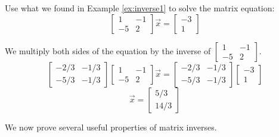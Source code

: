 \documentclass{ximera}
\begin{document}
\begin{example}\label{ex:inverse2} Use what we found in Example \ref{ex:inverse1} to solve the matrix equation:
$$\begin{bmatrix}1 & -1\\-5 & 2\end{bmatrix}\vec{x}=\begin{bmatrix}-3\\1\end{bmatrix}$$
\begin{explanation}
We multiply both sides of the equation by the inverse of $\begin{bmatrix}1 & -1\\-5 & 2\end{bmatrix}$.
$$\begin{bmatrix}-2/3 & -1/3\\-5/3 & -1/3\end{bmatrix}\begin{bmatrix}1 & -1\\-5 & 2\end{bmatrix}\vec{x}=\begin{bmatrix}-2/3 & -1/3\\-5/3 & -1/3\end{bmatrix}\begin{bmatrix}-3\\1\end{bmatrix}$$
$$\vec{x}=\begin{bmatrix}5/3\\14/3\end{bmatrix}$$
\end{explanation}
\end{example}

We now prove several useful properties of matrix inverses.
\end{document}
